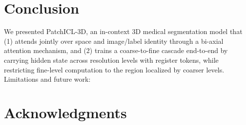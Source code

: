 \section{Conclusion}
\label{sec:conclusion}

We presented PatchICL-3D, an in-context 3D medical segmentation model
that (1) attends jointly over space and image/label identity through a
bi-axial attention mechanism, and (2) trains a coarse-to-fine cascade
end-to-end by carrying hidden state across resolution levels with
register tokens, while restricting fine-level computation to the region
localized by coarser levels. 
Limitations and future work: 

\section*{Acknowledgments}
